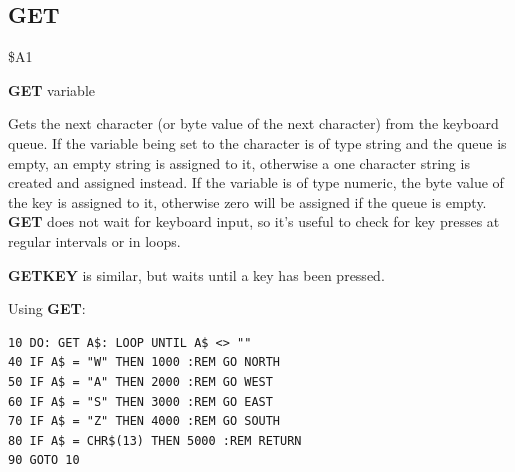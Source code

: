 \newpage
\subsection{GET}
\begin{description}[leftmargin=2cm,style=nextline]
\item [Token:] \$A1
\item [Format:] {\bf GET} variable
\item [Usage:] Gets the next character (or byte value of the next character)
               from the keyboard queue.
               If the variable being set to the character is of type string and the queue is empty,
               an empty string is assigned to it,
               otherwise a one character string is created
               and assigned instead.
               If the variable is of type numeric, the byte value
               of the key is assigned to it, otherwise zero will be assigned if the queue is empty.
               {\bf GET} does not wait for keyboard
               input, so it's useful to check for key presses
               at regular intervals or in loops.

\item [Remarks:] {\bf GETKEY} is similar, but waits
                 until a key has been pressed.

\item [Example:] Using {\bf GET}:
\begin{tcolorbox}[colback=black,coltext=white]
\verbatimfont{\codefont}
\begin{verbatim}
10 DO: GET A$: LOOP UNTIL A$ <> ""
40 IF A$ = "W" THEN 1000 :REM GO NORTH
50 IF A$ = "A" THEN 2000 :REM GO WEST
60 IF A$ = "S" THEN 3000 :REM GO EAST
70 IF A$ = "Z" THEN 4000 :REM GO SOUTH
80 IF A$ = CHR$(13) THEN 5000 :REM RETURN
90 GOTO 10
\end{verbatim}
\end{tcolorbox}
\end{description}


\newpage
